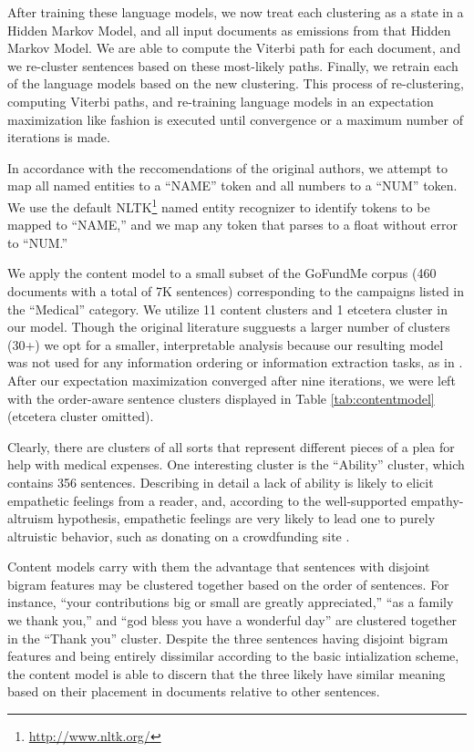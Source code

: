 \documentclass[letterpaper]{article}
\begin{document}
After training these language models, we now treat each clustering as a state in a Hidden Markov Model, and all input documents as emissions from that Hidden Markov Model. We are able to compute the Viterbi path for each document, and we re-cluster sentences based on these most-likely paths. Finally, we retrain each of the language models based on the new clustering. This process of re-clustering, computing Viterbi paths, and re-training language models in an expectation 
maximization like fashion is executed until convergence or a maximum number of iterations is made. 

In accordance with the reccomendations of the original authors, we attempt to map all named entities to a ``NAME'' token and all numbers to a ``NUM'' token. We use the default NLTK\footnote{\url{http://www.nltk.org/}} named entity recognizer to identify tokens to be mapped to ``NAME,'' and we map any token that parses to a float without error to ``NUM.''

We apply the content model to a small subset of the GoFundMe corpus (460 documents with a total of 7K sentences) corresponding to the campaigns listed in the ``Medical'' category. We utilize 11 content clusters and 1 etcetera cluster in our model. Though the original literature sugguests a larger number of clusters (30+) we opt for a smaller, interpretable analysis because our resulting model was not used for any information ordering or information extraction tasks, as in \cite{barzilay2004catching}. After our expectation maximization converged after nine iterations, we were left with the order-aware sentence clusters displayed in Table \ref{tab:contentmodel} (etcetera cluster omitted).

Clearly, there are clusters of all sorts that represent different pieces of a plea for help with medical expenses. One interesting cluster is the ``Ability'' cluster, which contains 356 sentences. Describing in detail a lack of ability is likely to elicit empathetic feelings from a reader, and, according to the well-supported empathy-altruism hypothesis, empathetic feelings are very likely to lead one to purely altruistic behavior, such as donating on a crowdfunding site \cite{batson1988five}.

Content models carry with them the advantage that sentences with disjoint bigram features may be clustered together based on the order of sentences. For instance, ``your contributions big or small are greatly appreciated,'' ``as a family we thank you,'' and ``god bless you have a wonderful day'' are clustered together in the ``Thank you'' cluster. Despite the three sentences having disjoint bigram features and being entirely dissimilar according to the basic intialization scheme, the content model is able to discern that the three likely have similar meaning based on their placement in documents relative to other sentences.
\end{document}
